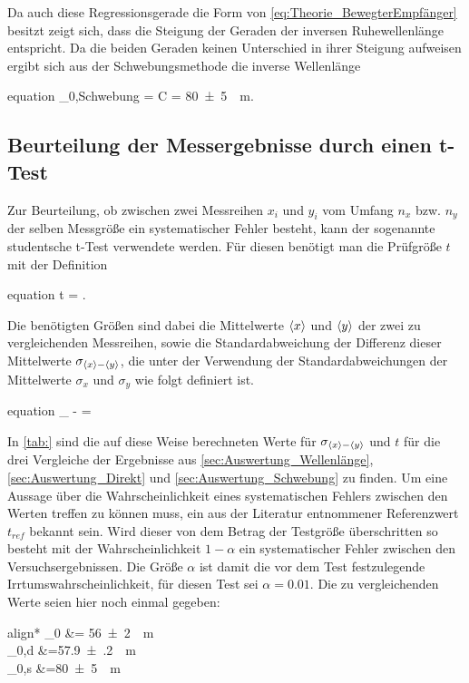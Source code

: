  	Da auch diese Regressionsgerade die Form von \cref{eq:Theorie_BewegterEmpfänger} besitzt zeigt
 	sich, dass die Steigung der Geraden der inversen Ruhewellenlänge entspricht. 
	Da die beiden Geraden keinen Unterschied in ihrer Steigung aufweisen ergibt sich aus der Schwebungsmethode
	die inverse Wellenlänge
	\begin{empheq}{equation}
		\label{eq:Auswertung_InverseWellenlänge_Schwebung}
		\lambda_{0,Schwebung} = C = \SI{80(5)}{\per\meter}.
	\end{empheq}

\subsection{Beurteilung der Messergebnisse durch einen t-Test}
	
	Zur Beurteilung, ob zwischen zwei Messreihen $x_{i}$ und $y_{i}$ vom Umfang $n_{x}$ bzw. $n_{y}$ 
	der selben Messgröße ein systematischer Fehler besteht, kann der sogenannte studentsche t-Test verwendete werden.
	Für diesen benötigt man die Prüfgröße $t$ mit der Definition
	\begin{empheq}{equation}
		\label{eq:Auswertung_tTest_t}
		t = .
	\end{empheq} 	
	Die benötigten Größen sind dabei die Mittelwerte $\langle x\rangle$ und $\langle y\rangle$ der zwei zu vergleichenden Messreihen,
	sowie die Standardabweichung der Differenz dieser Mittelwerte $\sigma_{\langle x\rangle - \langle y\rangle}$, die unter der 
	Verwendung der Standardabweichungen der Mittelwerte $\sigma_{x}$ und $\sigma_{y}$ wie folgt definiert ist.
	\begin{empheq}{equation}
		\label{eq:Auswertung_tTest_s}
		\sigma_{ - } = 
	\end{empheq} 
	In \cref{tab:} sind die auf diese Weise berechneten Werte für  $\sigma_{\langle x\rangle - \langle y\rangle}$ und $t$ für die drei Vergleiche
	der Ergebnisse aus \cref{sec:Auswertung_Wellenlänge}, \ref{sec:Auswertung_Direkt} und \ref{sec:Auswertung_Schwebung} zu finden.
	Um eine Aussage über die Wahrscheinlichkeit eines systematischen Fehlers zwischen den Werten treffen zu können muss, ein aus der 
	Literatur \cite{Bortz10} entnommener Referenzwert $t_{ref}$ bekannt sein. Wird dieser von dem Betrag der Testgröße  
	überschritten so besteht mit der Wahrscheinlichkeit $1 - \alpha$ ein systematischer Fehler zwischen den Versuchsergebnissen.  
	Die Größe $\alpha$ ist damit die vor dem Test festzulegende Irrtumswahrscheinlichkeit, für diesen Test sei $\alpha = 0.01$. 	
	Die zu vergleichenden Werte seien hier noch einmal gegeben:
	\begin{empheq}{align*}
		\lambda_{0}   &= \SI{56(2)}{\per\meter} \\
		\lambda_{0,d} &=\SI{57.9(2)}{\per\meter}\\
		\lambda_{0,s} &=\SI{80(5)}{\per\meter}
	\end{empheq}
	
